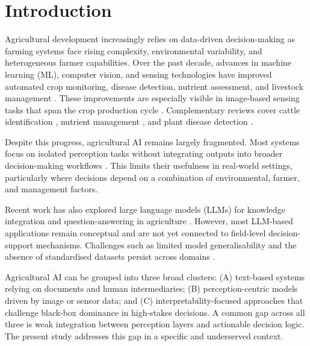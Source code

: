 \documentclass[3p,twocolumn,authoryear]{elsarticle}
\begin{document}
\linenumbers

\section{Introduction}

Agricultural development increasingly relies on data-driven decision-making
as farming systems face rising complexity, environmental variability, and
heterogeneous farmer capabilities.
Over the past decade, advances in machine learning (ML), computer vision,
and sensing technologies have improved automated crop monitoring, disease
detection, nutrient assessment, and livestock management
\citep{kamilaris2018,liakos2018,ghazal2024survey,yang2025}.
These improvements are especially visible in image-based sensing tasks that
span the crop production cycle \citep{ghazal2024survey}.
Complementary reviews cover cattle identification
\citep{hossain2022cattle}, nutrient management \citep{ennaji2023nutrient},
and plant disease detection \citep{omaye2024disease}.

Despite this progress, agricultural AI remains largely fragmented.
Most systems focus on isolated perception tasks without integrating outputs
into broader decision-making workflows
\citep{ghazal2024survey,omaye2024disease}.
This limits their usefulness in real-world settings, particularly where
decisions depend on a combination of environmental, farmer, and management
factors.

Recent work has also explored large language models (LLMs) for knowledge
integration and question-answering in agriculture \citep{li2025llm}.
However, most LLM-based applications remain conceptual and are not yet
connected to field-level decision-support mechanisms.
Challenges such as limited model generalisability and the absence of
standardised datasets persist across domains
\citep{hossain2022cattle,ennaji2023nutrient}.

Agricultural AI can be grouped into three broad clusters:
(A) text-based systems relying on documents and human intermediaries;
(B) perception-centric models driven by image or sensor data; and
(C) interpretability-focused approaches that challenge black-box dominance
in high-stakes decisions.
A common gap across all three is weak integration between perception layers
and actionable decision logic.
The present study addresses this gap in a specific and underserved context.
\end{document}
